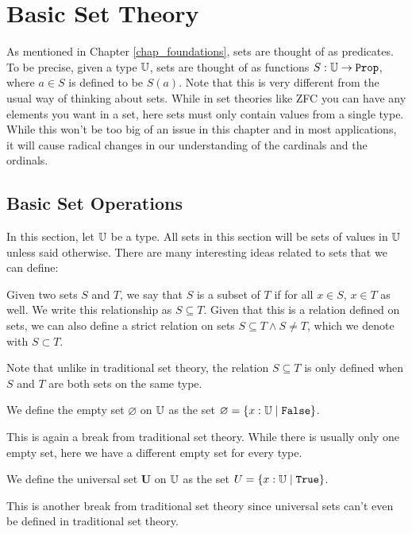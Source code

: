 \documentclass[../../math.tex]{subfiles}
\begin{document}
\setcounter{chapter}{3}

\chapter{Basic Set Theory} \label{chap_set}

As mentioned in Chapter \ref{chap_foundations}, sets are thought of as
predicates.  To be precise, given a type $\mathbb{U}$, sets are thought of as functions
$S : \U \rightarrow \vtt{Prop}$, where $a \in S$ is defined to be $S(a)$.  Note
that this is very different from the usual way of thinking about sets.  While in
set theories like ZFC you can have any elements you want in a set, here sets
must only contain values from a single type.  While this won't be too big of an
issue in this chapter and in most applications, it will cause radical changes in
our understanding of the cardinals and the ordinals.

\section{Basic Set Operations}

In this section, let $\mathbb{U}$ be a type.  All sets in this section will be sets of
values in $\mathbb{U}$ unless said otherwise.  There are many interesting ideas related
to sets that we can define:

\begin{definition}
    Given two sets $S$ and $T$, we say that $S$ is a subset of $T$ if for all $x
    \in S$, $x \in T$ as well.  We write this relationship as $S \subseteq T$.
    Given that this is a relation defined on sets, we can also define a strict
    relation on sets $S \subseteq T \wedge S \neq T$, which we denote with $S
    \subset T$.
\end{definition}
\noindent Note that unlike in traditional set theory, the relation $S \subseteq
T$ is only defined when $S$ and $T$ are both sets on the same type.

\begin{definition}
    We define the empty set $\varnothing$ on $\mathbb{U}$ as the set $\varnothing = \{x
    : \U \mid \vtt{False}\}$.
\end{definition}
\noindent This is again a break from traditional set theory.  While there is
usually only one empty set, here we have a different empty set for every type.

\begin{definition}
    We define the universal set $\bm U$ on $\mathbb{U}$ as the set $U = \{x : \U \mid
    \vtt{True}\}$.
\end{definition}
\noindent This is another break from traditional set theory since universal sets
can't even be defined in traditional set theory.
\end{document}

